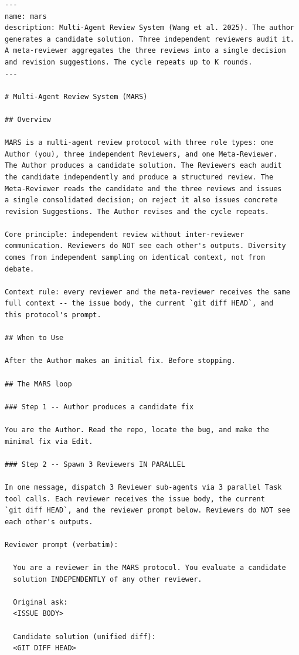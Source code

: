 \documentclass{article}
\begin{document}
\begin{footnotesize}
\begin{verbatim}
---
name: mars
description: Multi-Agent Review System (Wang et al. 2025). The author
generates a candidate solution. Three independent reviewers audit it.
A meta-reviewer aggregates the three reviews into a single decision
and revision suggestions. The cycle repeats up to K rounds.
---

# Multi-Agent Review System (MARS)

## Overview

MARS is a multi-agent review protocol with three role types: one
Author (you), three independent Reviewers, and one Meta-Reviewer.
The Author produces a candidate solution. The Reviewers each audit
the candidate independently and produce a structured review. The
Meta-Reviewer reads the candidate and the three reviews and issues
a single consolidated decision; on reject it also issues concrete
revision Suggestions. The Author revises and the cycle repeats.

Core principle: independent review without inter-reviewer
communication. Reviewers do NOT see each other's outputs. Diversity
comes from independent sampling on identical context, not from
debate.

Context rule: every reviewer and the meta-reviewer receives the same
full context -- the issue body, the current `git diff HEAD`, and
this protocol's prompt.

## When to Use

After the Author makes an initial fix. Before stopping.

## The MARS loop

### Step 1 -- Author produces a candidate fix

You are the Author. Read the repo, locate the bug, and make the
minimal fix via Edit.

### Step 2 -- Spawn 3 Reviewers IN PARALLEL

In one message, dispatch 3 Reviewer sub-agents via 3 parallel Task
tool calls. Each reviewer receives the issue body, the current
`git diff HEAD`, and the reviewer prompt below. Reviewers do NOT see
each other's outputs.

Reviewer prompt (verbatim):

  You are a reviewer in the MARS protocol. You evaluate a candidate
  solution INDEPENDENTLY of any other reviewer.

  Original ask:
  <ISSUE BODY>

  Candidate solution (unified diff):
  <GIT DIFF HEAD>


\end{verbatim}
\end{footnotesize}
\end{document}
